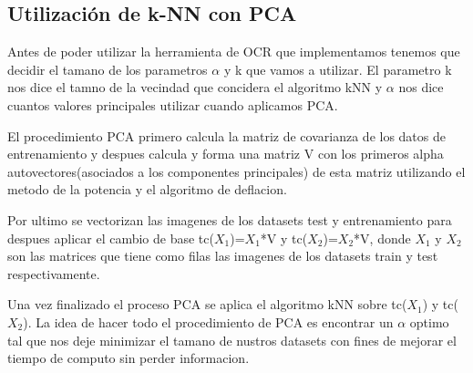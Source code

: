
\subsection{Utilización de k-NN con PCA}

Antes de poder utilizar la herramienta de OCR que implementamos tenemos que decidir el tamano de los parametros $\alpha$ y k que vamos a utilizar. El parametro k nos dice el tamno de la vecindad que concidera el algoritmo kNN y $\alpha$ nos dice cuantos valores principales utilizar cuando aplicamos PCA. \par
\indent El procedimiento PCA primero calcula la matriz de covarianza de los datos de entrenamiento y despues calcula y forma una matriz V con los primeros alpha autovectores(asociados a los componentes principales) de esta matriz utilizando el metodo de la potencia y el algoritmo de deflacion. \par
\indent Por ultimo se vectorizan las imagenes de los datasets test y entrenamiento para despues aplicar el cambio de base tc($X_{1}$)=$X_{1}$*V y tc($X_{2}$)=$X_{2}$*V, donde $X_{1}$ y $X_{2}$ son las matrices que tiene como filas las imagenes de los datasets train y test respectivamente. \par
\indent Una vez finalizado el proceso PCA se aplica el algoritmo kNN sobre  tc($X_{1}$) y tc($X_{2}$). La idea de hacer todo el procedimiento de PCA es encontrar un $\alpha$ optimo tal que nos deje minimizar el tamano de nustros datasets con fines de mejorar el tiempo de computo sin perder informacion.\par
